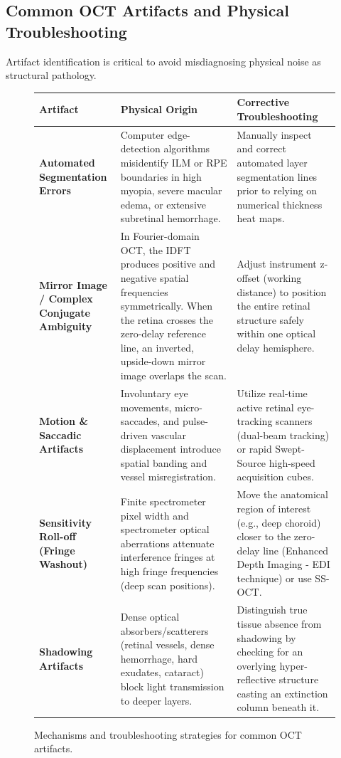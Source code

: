 \documentclass[11pt,a4paper]{article}
\begin{document}
\subsection{Common OCT Artifacts and Physical Troubleshooting}

Artifact identification is critical to avoid misdiagnosing physical noise as structural pathology.

\begin{figure}[htbp]
\centering
\begin{tabular}{p{3.5cm}p{5.5cm}p{5.5cm}}
\toprule
\textbf{Artifact} & \textbf{Physical Origin} & \textbf{Corrective Troubleshooting} \\
\midrule
\textbf{Automated Segmentation Errors} & Computer edge-detection algorithms misidentify ILM or RPE boundaries in high myopia, severe macular edema, or extensive subretinal hemorrhage. & Manually inspect and correct automated layer segmentation lines prior to relying on numerical thickness heat maps. \\
\addlinespace
\textbf{Mirror Image / Complex Conjugate Ambiguity} & In Fourier-domain OCT, the IDFT produces positive and negative spatial frequencies symmetrically. When the retina crosses the zero-delay reference line, an inverted, upside-down mirror image overlaps the scan. & Adjust instrument z-offset (working distance) to position the entire retinal structure safely within one optical delay hemisphere. \\
\addlinespace
\textbf{Motion \& Saccadic Artifacts} & Involuntary eye movements, micro-saccades, and pulse-driven vascular displacement introduce spatial banding and vessel misregistration. & Utilize real-time active retinal eye-tracking scanners (dual-beam tracking) or rapid Swept-Source high-speed acquisition cubes. \\
\addlinespace
\textbf{Sensitivity Roll-off (Fringe Washout)} & Finite spectrometer pixel width and spectrometer optical aberrations attenuate interference fringes at high fringe frequencies (deep scan positions). & Move the anatomical region of interest (e.g., deep choroid) closer to the zero-delay line (Enhanced Depth Imaging - EDI technique) or use SS-OCT. \\
\addlinespace
\textbf{Shadowing Artifacts} & Dense optical absorbers/scatterers (retinal vessels, dense hemorrhage, hard exudates, cataract) block light transmission to deeper layers. & Distinguish true tissue absence from shadowing by checking for an overlying hyper-reflective structure casting an extinction column beneath it. \\
\bottomrule
\end{tabular}
\caption{Mechanisms and troubleshooting strategies for common OCT artifacts.}
\label{tab:oct_artifacts}
\end{figure}
\end{document}
